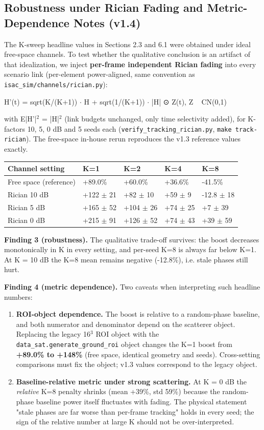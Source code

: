 \documentclass[11pt]{article}
\begin{document}
\subsection{Robustness under Rician Fading and Metric-Dependence Notes (v1.4)}

The K-sweep headline values in Sections 2.3 and 6.1 were obtained under ideal free-space channels. To test whether the qualitative conclusion is an artifact of that idealization, we inject \textbf{per-frame independent Rician fading} into every scenario link (per-element power-aligned, same convention as \texttt{isac\_sim/channels/rician.py}):

H'(t) = sqrt(K/(K+1)) $\cdot$ H + sqrt(1/(K+1)) $\cdot$ |H| ⊙ Z(t),  Z ~ CN(0,1)

with E|H'|$^2$ = |H|$^2$ (link budgets unchanged, only time selectivity added), for K-factors {10, 5, 0} dB and 5 seeds each (\texttt{verify\_tracking\_rician.py}, \texttt{make track-rician}). The free-space in-house rerun reproduces the v1.3 reference values exactly.

\begin{table}[ht]
\centering
\small
\begin{tabular}{lllll}
Channel setting & K=1 & K=2 & K=4 & K=8 \\
\hline
Free space (reference) & +89.0\% & +60.0\% & +36.6\% & -41.5\% \\
Rician 10 dB & +122 $\pm$ 21 & +82 $\pm$ 10 & +59 $\pm$ 9 & -12.8 $\pm$ 18 \\
Rician 5 dB & +165 $\pm$ 52 & +104 $\pm$ 26 & +74 $\pm$ 25 & +7 $\pm$ 39 \\
Rician 0 dB & +215 $\pm$ 91 & +126 $\pm$ 52 & +74 $\pm$ 43 & +39 $\pm$ 59 \\
\hline
\end{tabular}
\end{table}

\textbf{Finding 3 (robustness).} The qualitative trade-off survives: the boost decreases monotonically in K in every setting, and per-seed K=8 is always far below K=1. At K = 10 dB the K=8 mean remains negative (-12.8\%), i.e. stale phases still hurt.

\textbf{Finding 4 (metric dependence).} Two caveats when interpreting such headline numbers:
\begin{enumerate}
\item \textbf{ROI-object dependence.} The boost is relative to a random-phase baseline, and both numerator and denominator depend on the scatterer object. Replacing the legacy 16$^3$ ROI object with the \texttt{data\_sat.generate\_ground\_roi} object changes the K=1 boost from \textbf{+89.0\% to +148\%} (free space, identical geometry and seeds). Cross-setting comparisons must fix the object; v1.3 values correspond to the legacy object.
\item \textbf{Baseline-relative metric under strong scattering.} At K = 0 dB the \textit{relative} K=8 penalty shrinks (mean +39\%, std 59\%) because the random-phase baseline power itself fluctuates with fading. The physical statement "stale phases are far worse than per-frame tracking" holds in every seed; the sign of the relative number at large K should not be over-interpreted.
\end{enumerate}
\end{document}

